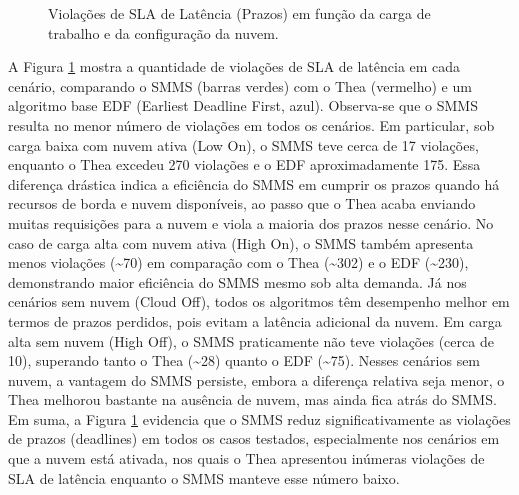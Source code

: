 \begin{figure}[ht!]
    \caption{Violações de SLA de Latência (Prazos) em função da carga de trabalho e da configuração da nuvem.}
    \label{fig:results}
\end{figure}


A Figura \ref{fig:results} mostra a quantidade de violações de SLA de latência em cada cenário, comparando o SMMS (barras verdes) com o Thea (vermelho) e um algoritmo base EDF (Earliest Deadline First, azul). Observa-se que o SMMS resulta no menor número de violações em todos os cenários. Em particular, sob carga baixa com nuvem ativa (Low On), o SMMS teve cerca de 17 violações, enquanto o Thea excedeu 270 violações e o EDF aproximadamente 175. Essa diferença drástica indica a eficiência do SMMS em cumprir os prazos quando há recursos de borda e nuvem disponíveis, ao passo que o Thea acaba enviando muitas requisições para a nuvem e viola a maioria dos prazos nesse cenário. No caso de carga alta com nuvem ativa (High On), o SMMS também apresenta menos violações (\textasciitilde 70) em comparação com o Thea (\textasciitilde302) e o EDF (\textasciitilde230), demonstrando maior eficiência do SMMS mesmo sob alta demanda. Já nos cenários sem nuvem (Cloud Off), todos os algoritmos têm desempenho melhor em termos de prazos perdidos, pois evitam a latência adicional da nuvem. Em carga alta sem nuvem (High Off), o SMMS praticamente não teve violações (cerca de 10), superando tanto o Thea (\textasciitilde28) quanto o EDF (\textasciitilde75). Nesses cenários sem nuvem, a vantagem do SMMS persiste, embora a diferença relativa seja menor, o Thea melhorou bastante na ausência de nuvem, mas ainda fica atrás do SMMS. Em suma, a Figura \ref{fig:results} evidencia que o SMMS reduz significativamente as violações de prazos (deadlines) em todos os casos testados, especialmente nos cenários em que a nuvem está ativada, nos quais o Thea apresentou inúmeras violações de SLA de latência enquanto o SMMS manteve esse número baixo.

